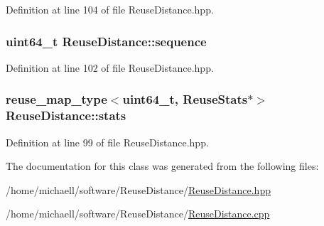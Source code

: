 Definition at line 104 of file ReuseDistance.hpp.

\hypertarget{class_reuse_distance_a5d38c22d7841765630b828eed50ac345}{
\subsubsection[{sequence}]{\setlength{\rightskip}{0pt plus 5cm}uint64\_\-t {\bf ReuseDistance::sequence}}}
\label{class_reuse_distance_a5d38c22d7841765630b828eed50ac345}


Definition at line 102 of file ReuseDistance.hpp.

\hypertarget{class_reuse_distance_a37e4f6796798fe8839e94c956b4354ee}{
\subsubsection[{stats}]{\setlength{\rightskip}{0pt plus 5cm}reuse\_\-map\_\-type$<$uint64\_\-t, {\bf ReuseStats}$\ast$$>$ {\bf ReuseDistance::stats}}}
\label{class_reuse_distance_a37e4f6796798fe8839e94c956b4354ee}


Definition at line 99 of file ReuseDistance.hpp.



The documentation for this class was generated from the following files:\begin{DoxyCompactItemize}
\item 
/home/michaell/software/ReuseDistance/\hyperlink{_reuse_distance_8hpp}{ReuseDistance.hpp}\item 
/home/michaell/software/ReuseDistance/\hyperlink{_reuse_distance_8cpp}{ReuseDistance.cpp}\end{DoxyCompactItemize}
